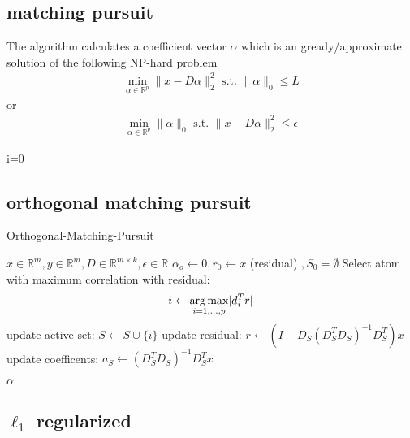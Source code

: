 \subsection{matching pursuit}
The algorithm calculates a coefficient vector $\alpha$ which is an gready/approximate solution of the following NP-hard problem
\begin{align}
\min_{\alpha\in\mathbb{R}^{p}}  \lVert x - D\alpha \rVert^{2}_{2} \textrm{ s.t. } \lVert \alpha \rVert_{0} \leq L
\end{align}
or
\begin{align}
\min_{\alpha\in\mathbb{R}^{p}}   \lVert \alpha \rVert_{0}   \textrm{ s.t. } \lVert x - D\alpha \rVert^{2}_{2} \leq \epsilon
\end{align}
\cite{Mallat1993}
\begin{algorithm}
\begin{algorithmic}
\STATE i=0
\end{algorithmic}
\end{algorithm}

\subsection{orthogonal matching pursuit}
\cite{Pati1993}
\label{sec:omp}


\begin{algorithm}
\caption{Orthogonal-Matching-Pursuit}
\begin{algorithmic}[1]
\REQUIRE $x \in \mathbb{R}^m, y \in \mathbb{R}^m, D \in \mathbb{R}^{m\times k}, \epsilon \in \mathbb{R}$
\STATE $\alpha_o \gets 0, r_0 \gets x $ (residual) $, S_0=\emptyset$
\STATE Select atom with maximum correlation with residual: 
\begin{equation*}
i \gets \operatorname*{arg\,max}_{i=1,...,p} \lvert d_i^Tr \rvert
\end{equation*}
\STATE update active set: $S \gets S \cup \{i\} $
\STATE update residual: $r \gets \left(I-D_S\left( D_S^T D_S \right)^{-1} D_S^T \right)x$
\STATE update coefficents: $a_S \gets \left( D_S^T D_S \right)^{-1} D_S^T x $

\ENDFOR
\RETURN $\alpha$
\end{algorithmic}
\end{algorithm}

\subsection {$\ell_1$ regularized}
